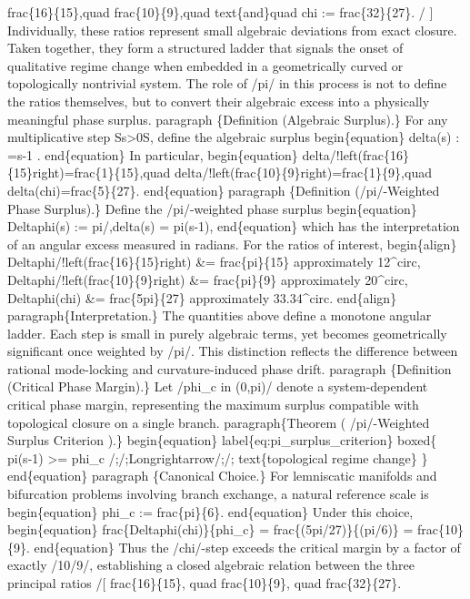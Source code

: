 frac\{16\}\{15\},quad frac\{10\}\{9\},quad text\{and\}quad chi := frac\{32\}\{27\}. / ] Individually, these ratios represent small algebraic deviations from exact closure. Taken together, they form a structured ladder that signals the onset of qualitative regime change when embedded in a geometrically curved or topologically nontrivial system. The role of /pi/ in this process is not to define the ratios themselves, but to convert their algebraic excess into a physically meaningful phase surplus. paragraph \{Definition (Algebraic Surplus).\} For any multiplicative step Ss>0S, define the algebraic surplus begin\{equation\} delta(s) : =s-1 . end\{equation\} In particular, begin\{equation\} delta/!left(frac\{16\}\{15\}right)=frac\{1\}\{15\},quad delta/!left(frac\{10\}\{9\}right)=frac\{1\}\{9\},quad delta(chi)=frac\{5\}\{27\}. end\{equation\} paragraph \{Definition (/pi/-Weighted Phase Surplus).\} Define the /pi/-weighted phase surplus begin\{equation\} Deltaphi(s) := pi/,delta(s) = pi(s-1), end\{equation\} which has the interpretation of an angular excess measured in radians. For the ratios of interest, begin\{align\} Deltaphi/!left(frac\{16\}\{15\}right) \&= frac\{pi\}\{15\} approximately 12\textasciicircum{}circ, Deltaphi/!left(frac\{10\}\{9\}right) \&= frac\{pi\}\{9\} approximately 20\textasciicircum{}circ, Deltaphi(chi) \&= frac\{5pi\}\{27\} approximately 33.34\textasciicircum{}circ. end\{align\} paragraph\{Interpretation.\} The quantities above define a monotone angular ladder. Each step is small in purely algebraic terms, yet becomes geometrically significant once weighted by /pi/. This distinction reflects the difference between rational mode-locking and curvature-induced phase drift. paragraph \{Definition (Critical Phase Margin).\} Let /phi\_c in (0,pi)/ denote a system-dependent critical phase margin, representing the maximum surplus compatible with topological closure on a single branch. paragraph\{Theorem ( /pi/-Weighted Surplus Criterion ).\} begin\{equation\} label\{eq:pi\_surplus\_criterion\} boxed\{ pi(s-1) >= phi\_c /;/;Longrightarrow/;/; text\{topological regime change\} \} end\{equation\} paragraph \{Canonical Choice.\} For lemniscatic manifolds and bifurcation problems involving branch exchange, a natural reference scale is begin\{equation\} phi\_c := frac\{pi\}\{6\}. end\{equation\} Under this choice, begin\{equation\} frac\{Deltaphi(chi)\}\{phi\_c\} = frac\{(5pi/27)\}\{(pi/6)\} = frac\{10\}\{9\}. end\{equation\} Thus the /chi/-step exceeds the critical margin by a factor of exactly /10/9/, establishing a closed algebraic relation between the three principal ratios /[ frac\{16\}\{15\}, quad frac\{10\}\{9\}, quad frac\{32\}\{27\}.

